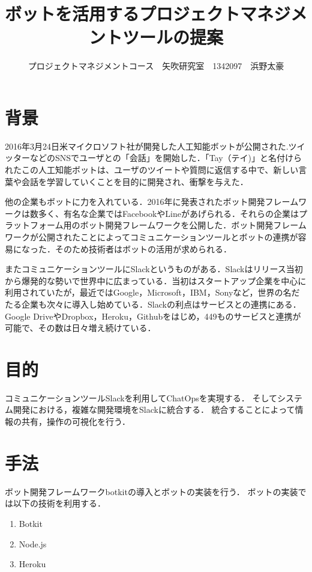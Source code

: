 \documentclass[uplatex,twocolumn,dvipdfmx]{jsarticle}
\title{\vspace{-5mm}\fontsize{14pt}{0pt}\selectfont ボットを活用するプロジェクトマネジメントツールの提案}
\author{\normalsize プロジェクトマネジメントコース　矢吹研究室　1342097　浜野太豪}
\date{}
\begin{document}
\fontsize{10.5pt}{\baselineskip}\selectfont
\maketitle





\section{背景}
2016年3月24日米マイクロソフト社が開発した人工知能ボットが公開された.ツイッターなどのSNSでユーザとの「会話」を開始した．「Tay（テイ)」と名付けられたこの人工知能ボットは、ユーザのツイートや質問に返信する中で、新しい言葉や会話を学習していくことを目的に開発され、衝撃を与えた．\cite{tay}

他の企業もボットに力を入れている．2016年に発表されたボット開発フレームワークは数多く、有名な企業ではFacebookやLineがあげられる．それらの企業はプラットフォーム用のボット開発フレームワークを公開した．ボット開発フレームワークが公開されたことによってコミュニケーションツールとボットの連携が容易になった．そのため技術者はボットの活用が求められる．

またコミュニケーションツールにSlackというものがある．Slackはリリース当初から爆発的な勢いで世界中に広まっている．当初はスタートアップ企業を中心に利用されていたが，最近ではGoogle，Microsoft，IBM，Sonyなど，世界の名だたる企業も次々に導入し始めている．Slackの利点はサービスとの連携にある．Google DriveやDropbox，Heroku，Githubをはじめ，449ものサービスと連携が可能で、その数は日々増え続けている．\cite{slack}
　




\section{目的}
コミュニケーションツールSlackを利用してChatOpsを実現する．
そしてシステム開発における，複雑な開発環境をSlackに統合する．
統合することによって情報の共有，操作の可視化を行う．



\section{手法}
ボット開発フレームワークbotkitの導入とボットの実装を行う．
ボットの実装では以下の技術を利用する．
\begin{enumerate}
\item Botkit
\item Node.js
\item Heroku
\end{enumerate}
\end{document}

